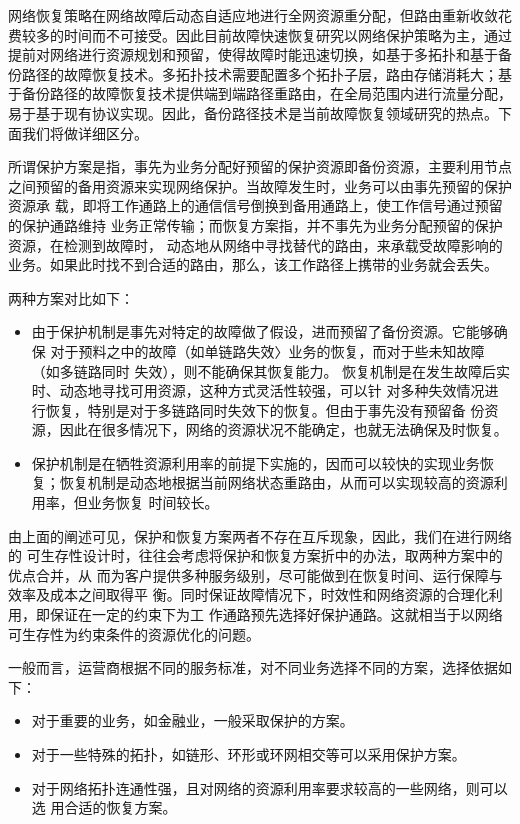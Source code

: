 网络恢复策略在网络故障后动态自适应地进行全网资源重分配，但路由重新收敛花费较多的时间而不可接受。因此目前故障快速恢复研究以网络保护策略为主，通过提前对网络进行资源规划和预留，使得故障时能迅速切换，如基于多拓扑\cite{shand2010ip}和基于备份路径的故障恢复技术。多拓扑技术需要配置多个拓扑子层，路由存储消耗大；基于备份路径的故障恢复技术提供端到端路径重路由，在全局范围内进行流量分配，易于基于现有协议实现。因此，备份路径技术是当前故障恢复领域研究的热点\cite{yang2014keep,suchara2011network,banner2010designing}。下面我们将做详细区分。

所谓保护方案是指，事先为业务分配好预留的保护资源即备份资源，主要利用节点 之间预留的备用资源来实现网络保护。当故障发生时，业务可以由事先预留的保护资源承 载，即将工作通路上的通信信号倒换到备用通路上，使工作信号通过预留的保护通路维持 业务正常传输；而恢复方案指，并不事先为业务分配预留的保护资源，在检测到故障时， 动态地从网络中寻找替代的路由，来承载受故障影响的业务。如果此时找不到合适的路由，那么，该工作路径上携带的业务就会丢失。

两种方案对比如下：
\begin{itemize}
  \item 由于保护机制是事先对特定的故障做了假设，进而预留了备份资源。它能够确保 对于预料之中的故障（如单链路失效〉业务的恢复，而对于些未知故障（如多链路同时 失效），则不能确保其恢复能力。
恢复机制是在发生故障后实时、动态地寻找可用资源，这种方式灵活性较强，可以针 对多种失效情况进行恢复，特别是对于多链路同时失效下的恢复。但由于事先没有预留备 份资源，因此在很多情况下，网络的资源状况不能确定，也就无法确保及时恢复。
  \item 保护机制是在牺牲资源利用率的前提下实施的，因而可以较快的实现业务恢复；恢复机制是动态地根据当前网络状态重路由，从而可以实现较高的资源利用率，但业务恢复 时间较长。
\end{itemize}
由上面的阐述可见，保护和恢复方案两者不存在互斥现象，因此，我们在进行网络的 可生存性设计时，往往会考虑将保护和恢复方案折中的办法，取两种方案中的优点合并，从 而为客户提供多种服务级别，尽可能做到在恢复时间、运行保障与效率及成本之间取得平 衡。同时保证故障情况下，时效性和网络资源的合理化利用，即保证在一定的约束下为工 作通路预先选择好保护通路。这就相当于以网络可生存性为约束条件的资源优化的问题。

一般而言，运营商根据不同的服务标准，对不同业务选择不同的方案，选择依据如下：
\begin{itemize}
\item 对于重要的业务，如金融业，一般采取保护的方案。
\item 对于一些特殊的拓扑，如链形、环形或环网相交等可以采用保护方案。
\item 对于网络拓扑连通性强，且对网络的资源利用率要求较高的一些网络，则可以选
用合适的恢复方案。
\end{itemize}

